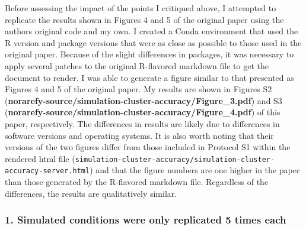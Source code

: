 \documentclass[
]{article}
\begin{document}
Before assessing the impact of the points I critiqued above, I attempted
to replicate the results shown in Figures 4 and 5 of the original paper
using the authors original code and my own. I created a Conda
environment that used the R version and package versions that were as
close as possible to those used in the original paper. Because of the
slight differences in packages, it was necessary to apply several
patches to the original R-flavored markdown file to get the document to
render. I was able to generate a figure similar to that presented as
Figures 4 and 5 of the original paper. My results are shown in Figures
S2 (\textbf{norarefy-source/simulation-cluster-accuracy/Figure\_3.pdf})
and S3
(\textbf{norarefy-source/simulation-cluster-accuracy/Figure\_4.pdf}) of
this paper, respectively. The differences in results are likely due to
differences in software versions and operating systems. It is also worth
noting that their versions of the two figures differ from those included
in Protocol S1 within the rendered html file
(\texttt{simulation-cluster-accuracy/simulation-cluster-accuracy-server.html})
and that the figure numbers are one higher in the paper than those
generated by the R-flavored markdown file. Regardless of the
differences, the results are qualitatively similar.

\hypertarget{simulated-conditions-were-only-replicated-5-times-each}{%
\subsubsection{1. Simulated conditions were only replicated 5 times
each}\label{simulated-conditions-were-only-replicated-5-times-each}}
\end{document}
